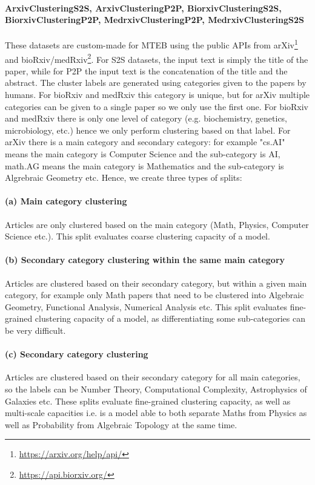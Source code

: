\documentclass[11pt]{article}
\begin{document}
\paragraph{ArxivClusteringS2S, ArxivClusteringP2P, BiorxivClusteringS2S, BiorxivClusteringP2P, MedrxivClusteringP2P, MedrxivClusteringS2S} These datasets are custom-made for MTEB using the public APIs from arXiv\footnote{\url{https://arxiv.org/help/api/}} and bioRxiv/medRxiv\footnote{\url{https://api.biorxiv.org/}}. For S2S datasets, the input text is simply the title of the paper, while for P2P the input text is the concatenation of the title and the abstract. The cluster labels are generated using categories given to the papers by humans. For bioRxiv and medRxiv this category is unique, but for arXiv multiple categories can be given to a single paper so we only use the first one. For bioRxiv and medRxiv there is only one level of category (e.g. biochemistry, genetics, microbiology, etc.) hence we only perform clustering based on that label. For arXiv there is a main category and secondary category: for example "cs.AI" means the main category is Computer Science and the sub-category is AI, math.AG means the main category is Mathematics and the sub-category is Algrebraic Geometry etc. Hence, we create three types of splits:

\paragraph{(a) Main category clustering} Articles are only clustered based on the main category (Math, Physics, Computer Science etc.). This split evaluates coarse clustering capacity of a model.

\paragraph{(b) Secondary category clustering within the same main category} Articles are clustered based on their secondary category, but within a given main category, for example only Math papers that need to be clustered into Algebraic Geometry, Functional Analysis, Numerical Analysis etc. This split evaluates fine-grained clustering capacity of a model, as differentiating some sub-categories can be very difficult.

\paragraph{(c) Secondary category clustering} Articles are clustered based on their secondary category for all main categories, so the labels can be Number Theory, Computational Complexity, Astrophysics of Galaxies etc. These splits evaluate fine-grained clustering capacity, as well as multi-scale capacities i.e. is a model able to both separate Maths from Physics as well as Probability from Algebraic Topology at the same time.
\end{document}
